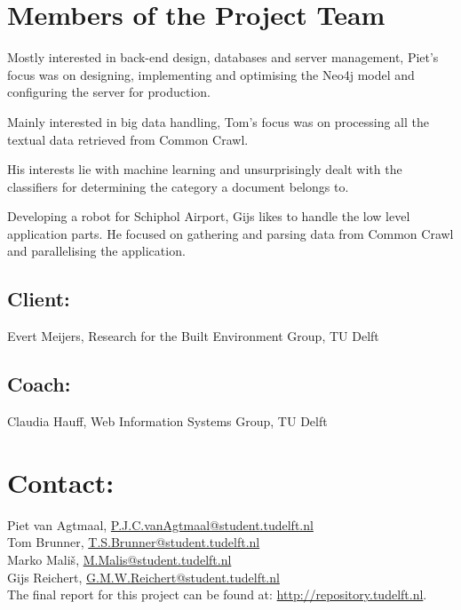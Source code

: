 \documentclass{article}
\begin{document}
\section*{Members of the Project Team}
\begin{description}[noitemsep]
\item[Piet van Agtmaal] Mostly interested in back-end design, databases and server management, Piet's focus was on designing, implementing and optimising the Neo4j model and configuring the server for production.
\item[Tom Brunner] Mainly interested in big data handling, Tom's focus was on processing all the textual data retrieved from Common Crawl.
\item[Marko Mali\v{s}] His interests lie with machine learning and unsurprisingly dealt with the classifiers for determining the category a document belongs to.
\item[Gijs Reichert] Developing a robot for Schiphol Airport, Gijs likes to handle the low level application parts. He focused on gathering and parsing data from Common Crawl and parallelising the application.
\end{description}

\subsection*{Client:}
Evert Meijers, Research for the Built Environment Group, TU Delft

\subsection*{Coach:}
Claudia Hauff, Web Information Systems Group, TU Delft

\section*{Contact:}
\noindent Piet van Agtmaal, \href{mailto:P.J.C.vanAgtmaal@student.tudelft.nl}{P.J.C.vanAgtmaal@student.tudelft.nl}\\
Tom Brunner, \href{mailto:T.S.Brunner@student.tudelft.nl}{T.S.Brunner@student.tudelft.nl}\\
Marko Mali\v{s}, \href{mailto:M.Malis@student.tudelft.nl}{M.Malis@student.tudelft.nl}\\
Gijs Reichert, \href{mailto:G.M.W.Reichert@student.tudelft.nl}{G.M.W.Reichert@student.tudelft.nl}\\

\noindent The final report for this project can be found at: \url{http://repository.tudelft.nl}.
\end{document}
